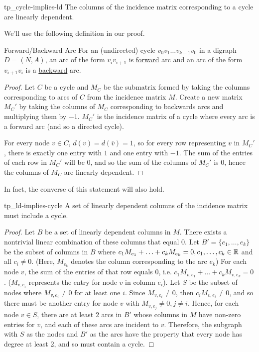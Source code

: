 \begin{proposition}{}{tp_cycle-implies-ld}
  The columns of the incidence matrix corresponding to a cycle are linearly dependent.
\end{proposition}
We'll use the following definition in our proof.
\begin{definition}{Forward/Backward Arc}{}
  For an (undirected) cycle $v_0v_1\ldots v_{k-1}v_0$ in a digraph $D = (N,A)$, an arc of the form $v_iv_{i+1}$ is \underline{forward} arc and an arc of the form $v_{i+1}v_i$ is a \underline{backward} arc.
\end{definition}
\begin{proof}
Let $C$ be a cycle and $M_C$ be the submatrix formed by taking the columns corresponding to arcs of $C$ from the incidence matrix $M$.
 Create a new matrix $M_C'$ by taking the columns of $M_C$ corresponding to backwards arcs and multiplying them by $-1$.
 $M_C'$ is the incidence matrix of a cycle where every arc is a forward arc (and so a directed cycle).

 For every node $v \in C$, $d(v) = d(\overline{v}) = 1$, so for every row representing $v$ in $M_C'$, there is exactly one entry with $1$ and one entry with $-1$.
 The sum of the entries of each row in $M_C'$ will be $0$, and so the sum of the columns of $M_C'$ is $0$, hence the columns of $M_C$ are linearly dependent.
\end{proof}

In fact, the converse of this statement will also hold.
\begin{proposition}{}{tp_ld-implies-cycle}
  A set of linearly dependent columns of the incidence matrix must include a cycle.
\end{proposition}
\begin{proof}
  Let $B$ be a set of linearly dependent columns in $M$.
  There exists a nontrivial linear combination of these columns that equal $0$.
  Let $B' = \{e_1, \ldots, e_k \}$ be the subset of columns in $B$ where $c_1M_{e_1} + \ldots + c_kM_{e_k} = 0, c_1, \ldots, c_k \in \mathbb{R}$ and all $c_i \neq 0$. (Here, $M_{e_k}$ denotes the column corresponding to the arc $e_k$)
  For each node $v$, the sum of the entries of that row equals $0$, i.e. $c_1M_{v,e_1} + \ldots + c_kM_{v, e_k} = 0$. ($M_{v,e_i}$ represents the entry for node $v$ in column $e_i$).
  Let $S$ be the subset of nodes where $M_{v,e_i} \neq 0$ for at least one $i$.
  Since $M_{v, e_i} \neq 0$, then $c_iM_{v, e_i} \neq 0$, and so there must be another entry for node $v$ with $M_{v, e_j} \neq 0, j \neq i$.
  Hence, for each node $v \in S$, there are at least 2 arcs in $B'$ whose columns in $M$ have non-zero entries for $v$, and each of these arcs are incident to $v$.
  Therefore, the subgraph with $S$ as the nodes and $B'$ as the arcs have the property that every node has degree at least 2, and so must contain a cycle.
\end{proof}

